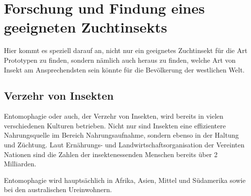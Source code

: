 \def \currentAuthor{Leonid Hammer}
\chapter{Forschung und Findung eines geeigneten Zuchtinsekts}
Hier kommt es speziell darauf an, nicht nur ein geeignetes Zuchtinsekt für die Art Prototypen zu finden, sondern nämlich auch heraus zu finden, welche Art von Insekt am Ansprechendsten sein könnte für die Bevölkerung der westlichen Welt.

\section{Verzehr von Insekten}
Entomophagie oder auch, der Verzehr von Insekten, wird bereits in vielen verschiedenen Kulturen betrieben. Nicht nur sind Insekten eine effizientere Nahrungsquelle im Bereich Nahrungsaufnahme, sondern ebenso in der Haltung und Züchtung. Laut Ernährungs- und Landwirtschaftsorganisation der Vereinten Nationen sind die Zahlen der insektenessenden Menschen bereits über 2 Milliarden.

Entomophagie wird hauptsächlich in Afrika, Asien, Mittel und Südamerika sowie bei den australischen Ureinwohnern.

